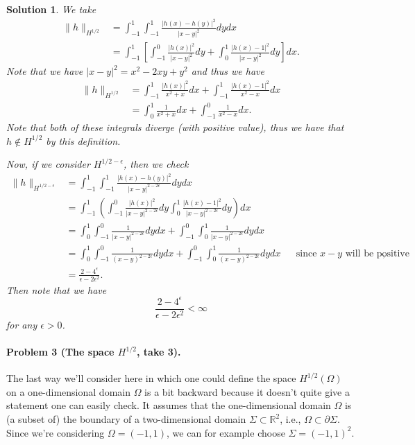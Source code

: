 \documentclass[leqno]{article}
\theoremstyle{nonumberplain}
\newtheorem{solution}{Solution}
\newcommand{\R}{\mathbb{R}}
\begin{document}
\begin{solution}
We take
\begin{align*}
    \|h\|_{H^{1/2}} &= \int_{-1}^1 \int_{-1}^1 \frac{|h(x)-h(y)|^2}{|x-y|^2}dydx\\
    &= \int_{-1}^1 \left[ \int_{-1}^0 \frac{|h(x)|^2}{|x-y|^2}dy + \int_0^1 \frac{|h(x)-1|^2}{|x-y|^2}dy\right]dx.
\end{align*}
Note that we have $|x-y|^2=x^2-2xy+y^2$ and thus we have
\begin{align*}
\|h\|_{H^{1/2}} &= \int_{-1}^1 \frac{|h(x)|^2}{x^2+x}dx+\int_{-1}^1 \frac{|h(x)-1|^2}{x^2-x}dx\\
&= \int_0^1 \frac{1}{x^2+x}dx + \int_{-1}^0 \frac{1}{x^2-x}dx.
\end{align*}
Note that both of these integrals diverge (with positive value), thus we have that $h\notin H^{1/2}$ by this definition.

Now, if we consider $H^{1/2-\epsilon}$, then we check
\begin{align*}
\|h\|_{H^{1/2-\epsilon}} &= \int_{-1}^1 \int_{-1}^1 \frac{|h(x)-h(y)|^2}{|x-y|^{2-2\epsilon}}dydx\\
&= \int_{-1}^1 \left( \int_{-1}^0 \frac{|h(x)|^2}{|x-y|^{2-2\epsilon}}dy \int_0^1 \frac{|h(x)-1|^2}{|x-y|^{2-2\epsilon}}dy \right)dx\\
&= \int_0^1 \int_{-1}^0 \frac{1}{|x-y|^{2-2\epsilon}}dydx + \int_{-1}^0 \int_0^1 \frac{1}{|x-y|^{2-2\epsilon}}dydx\\
&= \int_0^1 \int_{-1}^0 \frac{1}{(x-y)^{2-2\epsilon}} dydx + \int_{-1}^0 \int_0^1 \frac{1}{(x-y)^{2-2\epsilon}} dydx &&\textrm{since $x-y$ will be positive},\\
&= \frac{2-4^\epsilon}{\epsilon-2\epsilon^2}.
\end{align*}
Then note that we have
\[
\frac{2-4^\epsilon}{\epsilon-2\epsilon^2}<\infty 
\]
for any $\epsilon>0$.
\end{solution}
\pagebreak

\paragraph{Problem 3 (The space $H^{1/2}$, take 3).}
The last way we'll consider here in which one could define the space
$H^{1/2}(\Omega)$ on a one-dimensional domain $\Omega$ is a bit
backward because it doesn't quite give a statement one can easily
check. It assumes that the one-dimensional domain $\Omega$ is (a
subset of) the boundary of a two-dimensional domain $\Sigma\subset\R^2$, i.e.,
$\Omega\subset\partial\Sigma$. Since we're considering
$\Omega=(-1,1)$, we can for example choose $\Sigma=(-1,1)^2$.
\end{document}
